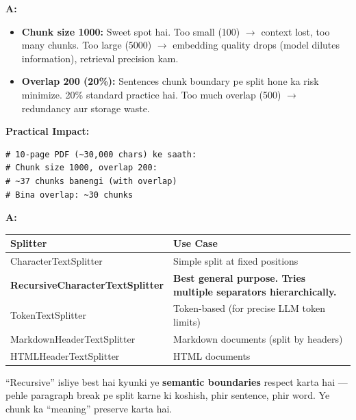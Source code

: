 \documentclass[12pt, a4paper]{article}
\begin{document}
\begin{interviewbox}[title={\faIcon{user-tie} ~Q22: Chunk size 1000 aur overlap 200 kyun?}]
\textbf{A:}
\begin{itemize}
\item \textbf{Chunk size 1000:} Sweet spot hai. Too small (100) $\rightarrow$ context lost, too many chunks. Too large (5000) $\rightarrow$ embedding quality drops (model dilutes information), retrieval precision kam.
\item \textbf{Overlap 200 (20\%):} Sentences chunk boundary pe split hone ka risk minimize. 20\% standard practice hai. Too much overlap (500) $\rightarrow$ redundancy aur storage waste.
\end{itemize}

\textbf{Practical Impact:}
\begin{lstlisting}[style=pythonstyle]
# 10-page PDF (~30,000 chars) ke saath:
# Chunk size 1000, overlap 200:
# ~37 chunks banengi (with overlap)
# Bina overlap: ~30 chunks
\end{lstlisting}
\end{interviewbox}

\begin{interviewbox}[title={\faIcon{user-tie} ~Q23: RecursiveCharacterTextSplitter vs aur splitters?}]
\textbf{A:}
\begin{center}
\small
\begin{tabular}{|l|p{8cm}|}
\hline
\rowcolor{accentpurple!15}
\textbf{Splitter} & \textbf{Use Case} \\
\hline
CharacterTextSplitter & Simple split at fixed positions \\
\hline
\textbf{RecursiveCharacterTextSplitter} & \textbf{Best general purpose. Tries multiple separators hierarchically.} \\
\hline
TokenTextSplitter & Token-based (for precise LLM token limits) \\
\hline
MarkdownHeaderTextSplitter & Markdown documents (split by headers) \\
\hline
HTMLHeaderTextSplitter & HTML documents \\
\hline
\end{tabular}
\end{center}

``Recursive'' isliye best hai kyunki ye \textbf{semantic boundaries} respect karta hai --- pehle paragraph break pe split karne ki koshish, phir sentence, phir word. Ye chunk ka ``meaning'' preserve karta hai.
\end{interviewbox}
\end{document}
